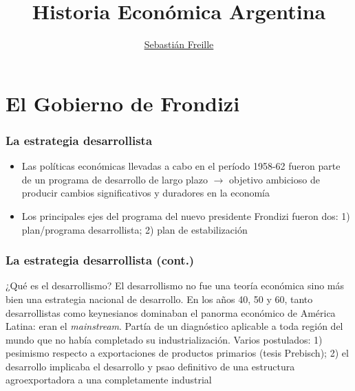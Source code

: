 \documentclass[14pt,aspectratio=169]{beamer}
\title{Historia Económica Argentina}
\author{\underline{Sebastián Freille} \inst{1}}
\institute[shortinst]{\inst{1} IEF-UNC \\ UCC}
\date{}
\begin{document}
{
  \begin{frame}
    \titlepage
  \end{frame}
}


\section{El Gobierno de Frondizi}

\begin{frame}\frametitle{La estrategia desarrollista}
                 \begin{itemize}\itemsep 5pt \medskip
                 \item Las políticas económicas llevadas a cabo en el
                   período 1958-62 fueron parte de un programa de
                   desarrollo de
                   largo plazo $\longrightarrow$ objetivo ambicioso de
                   producir cambios significativos y duradores en la
                   economía
                   \item Los principales ejes del programa del nuevo
                     presidente Frondizi fueron dos: 1) plan/programa
                     desarrollista; 2) plan de estabilización 
                   \end{itemize}
               \end{frame}


               
\begin{frame}\frametitle{La estrategia desarrollista (cont.)}
                 \begin{block}{¿Qué es el desarrollismo?}
El desarrollismo no fue una teoría económica sino más bien una estrategia
nacional de desarrollo. En los años 40, 50 y 60, tanto desarrollistas
como keynesianos dominaban el panorma económico de América Latina:
eran el \textit{mainstream}.  Partía de un diagnóstico aplicable a toda
región del mundo que no había completado su industrialización. Varios
postulados: 1) pesimismo respecto a exportaciones de productos
primarios (tesis Prebisch); 2) el desarrollo implicaba el desarrollo y
psao definitivo de una estructura agroexportadora a una completamente industrial
\end{block}
                 \end{frame}
               
\end{document}
